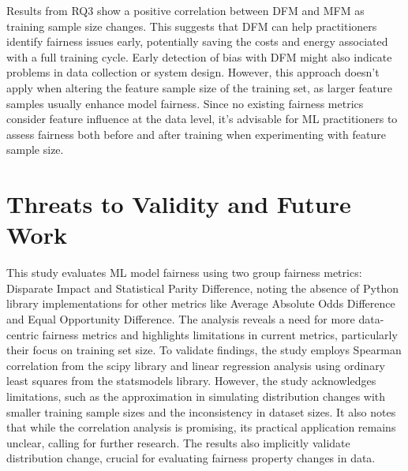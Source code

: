 \documentclass[sigconf,review]{acmart}
\begin{document}
Results from RQ3 show a positive correlation between DFM and MFM as
training sample size changes. This suggests that DFM can help
practitioners identify fairness issues early, potentially saving the
costs and energy associated with a full training cycle. Early
detection of bias with DFM might also indicate problems in data
collection or system design. However, this approach doesn't apply when
altering the feature sample size of the training set, as larger
feature samples usually enhance model fairness. Since no existing
fairness metrics consider feature influence at the data level, it's
advisable for ML practitioners to assess fairness both before and
after training when experimenting with feature sample size.



\section{Threats to Validity and Future Work}\label{sec:threats}

This study evaluates ML model fairness using two group fairness
metrics: Disparate Impact and Statistical Parity Difference, noting
the absence of Python library implementations for other metrics like
Average Absolute Odds Difference and Equal Opportunity Difference. The
analysis reveals a need for more data-centric fairness metrics and
highlights limitations in current metrics, particularly their focus on
training set size. To validate findings, the study employs Spearman
correlation from the scipy library and linear regression analysis
using ordinary least squares from the statsmodels library. However,
the study acknowledges limitations, such as the approximation in
simulating distribution changes with smaller training sample sizes and
the inconsistency in dataset sizes. It also notes that while the
correlation analysis is promising, its practical application remains
unclear, calling for further research. The results also implicitly
validate distribution change, crucial for evaluating fairness property
changes in data.
\end{document}
